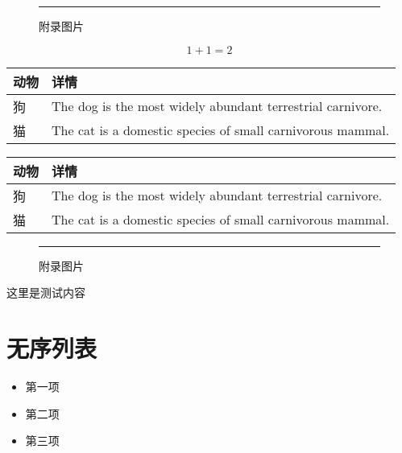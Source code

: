 \newpage %


\begin{figure}[h!]
	\centering\rule{1cm}{1cm}
	\caption{附录图片}
\end{figure}

\begin{equation}
	1+1=2
\end{equation}

\begin{table}[ht]
	\centering
	
	\label{tab:t1} %
	\begin{tabular}{lp{10cm}}
		\toprule
		动物 & 详情 \\
		\midrule
		狗    & The dog is the most widely abundant terrestrial carnivore. \\
		\addlinespace
		猫    & The cat is a domestic species of small carnivorous mammal.\\
		\bottomrule
	\end{tabular}
\end{table}

\begin{table}[ht]
	\centering
	
	\label{tab:t1} %
	\begin{tabular}{lp{10cm}}
		\toprule
		动物 & 详情 \\
		\midrule
		狗    & The dog is the most widely abundant terrestrial carnivore. \\
		\addlinespace
		猫    & The cat is a domestic species of small carnivorous mammal.\\
		\bottomrule
	\end{tabular}
\end{table}

\begin{figure}[h!]
	\centering\rule{1cm}{1cm}
	\caption{附录图片}
\end{figure}

\newpage
这里是测试内容
\section*{无序列表}
\begin{itemize}
	\item 第一项
	\item 第二项
	\item 第三项
\end{itemize}

